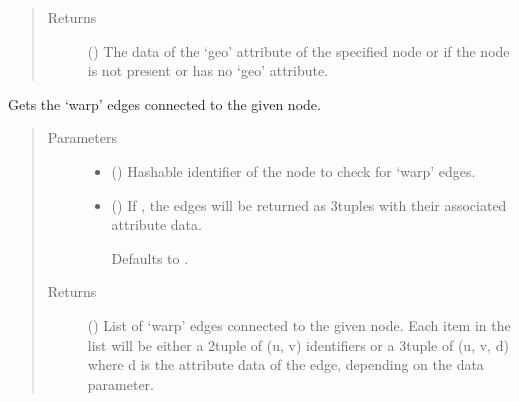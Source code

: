 \documentclass[letterpaper,10pt,english]{sphinxmanual}
\begin{document}
\begin{fulllineitems}
\begin{fulllineitems}
\begin{quote}
\begin{description}
\item[{Returns}] \leavevmode
{} () \textendash{} The data of the ‘geo’ attribute of the specified node or 
if the node is not present or has no ‘geo’ attribute.

\end{description}\end{quote}

\end{fulllineitems}


\begin{fulllineitems}
\label{\detokenize{cockatoo:cockatoo.KnitNetworkBase.node_warp_edges}}
Gets the ‘warp’ edges connected to the given node.
\begin{quote}\begin{description}
\item[{Parameters}] \leavevmode\begin{itemize}
\item {} 
 () \textendash{} Hashable identifier of the node to check for ‘warp’ edges.

\item {} 
 (\sphinxstyleliteralemphasis{\sphinxupquote{, }}) \textendash{} 
If , the edges will be returned as 3\sphinxhyphen{}tuples with their
associated attribute data.

Defaults to .


\end{itemize}

\item[{Returns}] \leavevmode
{} () \textendash{} List of ‘warp’ edges connected to the given node. Each item in the
list will be either a 2\sphinxhyphen{}tuple of (u, v) identifiers or a 3\sphinxhyphen{}tuple
of (u, v, d) where d is the attribute data of the edge, depending
on the data parameter.


\end{description}
\end{quote}
\end{fulllineitems}
\end{fulllineitems}
\end{document}
